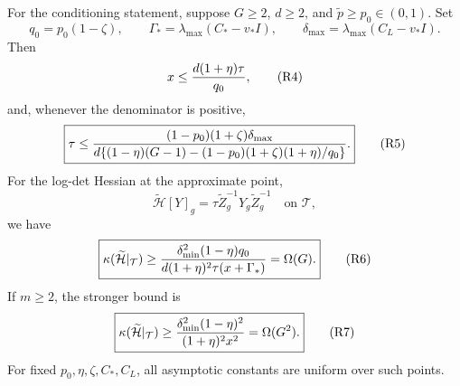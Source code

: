 \begin{theorem}
For the conditioning statement, suppose $G\ge2$, $d\ge2$, and
$\widetilde p\ge p_0\in(0,1)$.  Set
\begin{equation}
 q_0=p_0(1-\zeta),\qquad
 \Gamma_*=\lambda_{\max}(C_*-v_*I),\qquad
 \delta_{\max}=\lambda_{\max}(C_L-v_*I).                 \label{eq:cond-robust-constants}
\end{equation}
Then
\begin{equation*}
 x\le\frac{d(1+\eta)\tau}{q_0},                           \condtag{R4}\label{eq:cond-r8}
\end{equation*}
and, whenever the denominator is positive,
\begin{equation*}
 \boxed{\tau\le
 \frac{(1-p_0)(1+\zeta)\delta_{\max}}
 {d\{(1-\eta)(G-1)-(1-p_0)(1+\zeta)(1+\eta)/q_0\}}.}     \condtag{R5}\label{eq:cond-r9}
\end{equation*}
For the log-det Hessian at the approximate point,
\begin{equation}
 \widetilde{\mathcal H}[Y]_g
 =\tau\widetilde Z_g^{-1}Y_g\widetilde Z_g^{-1}
 \quad\text{on }\mathcal T,                               \label{eq:cond-robust-hessian}
\end{equation}
we have
\begin{equation*}
 \boxed{\kappa(\widetilde{\mathcal H}|_{\mathcal T})\ge
 \frac{\delta_{\min}^2(1-\eta)q_0}
 {d(1+\eta)^2\tau(x+\Gamma_*)}=\Omega(G).}                \condtag{R6}\label{eq:cond-r13}
\end{equation*}
If $m\ge2$, the stronger bound is
\begin{equation*}
 \boxed{\kappa(\widetilde{\mathcal H}|_{\mathcal T})\ge
 \frac{\delta_{\min}^2(1-\eta)^2}{(1+\eta)^2x^2}
 =\Omega(G^2).}                                            \condtag{R7}\label{eq:cond-r14}
\end{equation*}
For fixed $p_0,\eta,\zeta,C_*,C_L$, all asymptotic constants are uniform
over such points.
\end{theorem}

